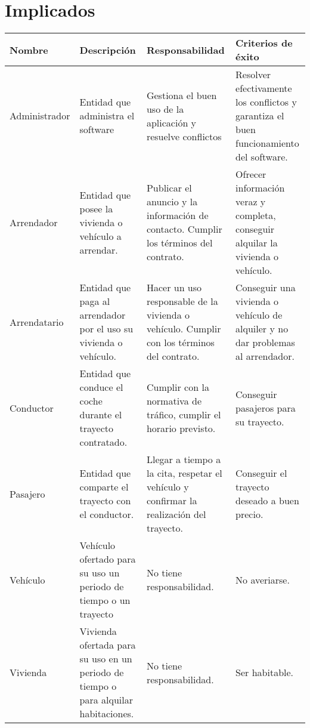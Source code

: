 \documentclass[11pt,spanish]{article} %
\begin{document}
\section{Implicados}

\begin{table}[H]
	\centering
		\begin{tabular}{|p{0.9in}|p{1.5in}|p{1.75in}|p{1.75in}|}
			\hline
			Nombre & Descripción & Responsabilidad & Criterios de éxito \\ \hline
			
			Administrador & Entidad que administra el software & Gestiona el buen uso de la aplicación y resuelve conflictos & Resolver efectivamente los conflictos y garantiza el buen funcionamiento del software. \\ \hline
			
			Arrendador & Entidad que posee la vivienda o vehículo a arrendar. & Publicar el anuncio y la información de contacto. Cumplir los términos del contrato. & Ofrecer información veraz y completa, conseguir alquilar la vivienda o vehículo. \\ \hline
			
			Arrendatario & Entidad que paga al arrendador por el uso su vivienda o vehículo. & Hacer un uso responsable de la vivienda o vehículo. Cumplir con los términos del contrato. & Conseguir una vivienda o vehículo de alquiler y no dar problemas al arrendador. \\ \hline
			
			Conductor & Entidad que conduce el coche durante el trayecto contratado. & Cumplir con la normativa de tráfico, cumplir el horario previsto. & Conseguir pasajeros para su trayecto. \\ \hline
			
			Pasajero & Entidad que comparte el trayecto con el conductor. & Llegar a tiempo a la cita, respetar el vehículo y confirmar la realización del trayecto. & Conseguir el trayecto deseado a buen precio. \\ \hline
			
			Vehículo & Vehículo ofertado para su uso un periodo de tiempo o un trayecto & No tiene responsabilidad. & No averiarse. \\ \hline
			
			Vivienda & Vivienda ofertada para su uso en un periodo de tiempo o para alquilar habitaciones. & No tiene responsabilidad. & Ser habitable.\\ \hline
		\end{tabular}%

\end{table}
\end{document}
